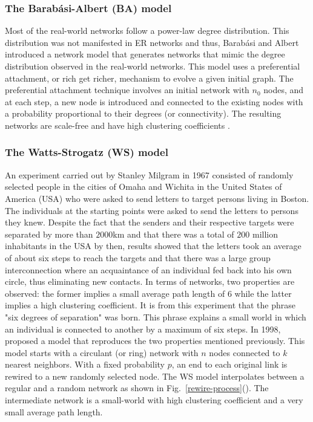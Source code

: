 \documentclass[10pt,a4paper]{article}
\theoremstyle{plain}
\theoremstyle{definition}
\begin{document}
\subsubsection{The Barab\'{a}si-Albert (BA) model}

Most of the real-world networks follow a power-law degree distribution. This  distribution was not manifested in ER networks and thus, Barab\'{a}si and Albert introduced a network model that generates networks that mimic the degree distribution observed in the real-world networks. This model uses a preferential attachment, or
rich get richer, mechanism to evolve a given initial graph. The preferential attachment technique involves an initial network with $n_0$ nodes, and at each step, a new node is introduced and connected to the existing nodes with a probability proportional to their degrees (or connectivity). The resulting networks are scale-free and have high clustering coefficients \citep{estrada2011structure}. 

\subsubsection{The Watts-Strogatz (WS) model}

An experiment carried out by Stanley Milgram in 1967 \citep{milgram1967small} consisted of randomly selected people in the cities of Omaha and Wichita in the United States of America (USA) who were asked to send letters to target persons living in Boston. The individuals at the starting points were asked to send the letters to persons they knew. Despite the fact that the senders and their respective targets were separated by more than $2000$km and that there was a total of $200$ million inhabitants in the USA by then, results showed that the letters took an average of about six steps to reach the targets and that there was a large group interconnection where an acquaintance of an individual fed back into his own circle, thus eliminating new contacts. In terms of networks, two properties are observed: the former implies a small average path length of $6$ while the latter implies a high clustering coefficient. It is from this experiment that the phrase "six degrees of separation" was born. This phrase explains a small world in which an individual is connected to another by a maximum of six steps. In 1998, \cite{watts1998collective} proposed a model that reproduces the two properties mentioned previously. This model starts with a circulant (or ring) network with $n$ nodes connected to $k$ nearest neighbors. With a fixed probability $p$, an end to each original link is rewired to a new randomly selected node. The WS model interpolates between a regular and a random network as shown in Fig.~\ref{rewire-process}(). The intermediate network is a small-world with high clustering coefficient and a very small average path length. 
\end{document}

